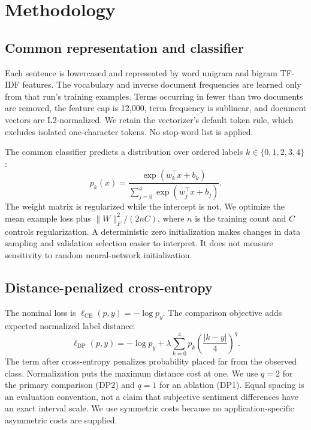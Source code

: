 \documentclass[10pt,twocolumn]{article}
\begin{document}
\section{Methodology}
\subsection{Common representation and classifier}
Each sentence is lowercased and represented by word unigram and bigram TF-IDF features. The vocabulary and inverse document frequencies are learned only from that run's training examples. Terms occurring in fewer than two documents are removed, the feature cap is 12,000, term frequency is sublinear, and document vectors are L2-normalized. We retain the vectorizer's default token rule, which excludes isolated one-character tokens. No stop-word list is applied.

The common classifier predicts a distribution over ordered labels $k\in\{0,1,2,3,4\}$:
\begin{equation}
 p_k(x)=\frac{\exp(w_k^\top x+b_k)}{\sum_{j=0}^{4}\exp(w_j^\top x+b_j)}.
\end{equation}
The weight matrix is regularized while the intercept is not. We optimize the mean example loss plus $\|W\|_F^2/(2nC)$, where $n$ is the training count and $C$ controls regularization. A deterministic zero initialization makes changes in data sampling and validation selection easier to interpret. It does not measure sensitivity to random neural-network initialization.

\subsection{Distance-penalized cross-entropy}
The nominal loss is $\ell_{\mathrm{CE}}(p,y)=-\log p_y$. The comparison objective adds expected normalized label distance:
\begin{equation}
 \ell_{\mathrm{DP}}(p,y)= -\log p_y+
 \lambda\sum_{k=0}^{4}p_k\left(\frac{|k-y|}{4}\right)^q.
 \label{eq:dp}
\end{equation}
The term after cross-entropy penalizes probability placed far from the observed class. Normalization puts the maximum distance cost at one. We use $q=2$ for the primary comparison (DP2) and $q=1$ for an ablation (DP1). Equal spacing is an evaluation convention, not a claim that subjective sentiment differences have an exact interval scale. We use symmetric costs because no application-specific asymmetric costs are supplied.
\end{document}
